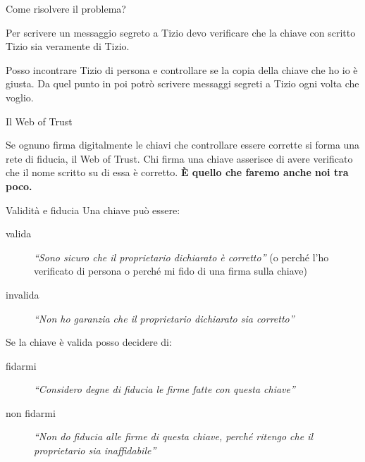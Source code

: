 \documentclass{beamer}
\begin{document}
\begin{frame}{Come risolvere il problema?}

  Per scrivere un messaggio segreto a Tizio devo verificare che la chiave con
  scritto Tizio sia veramente di Tizio.

    Posso incontrare Tizio di persona e controllare se la copia della
    chiave che ho io è giusta. Da quel punto in poi potrò scrivere
    messaggi segreti a Tizio ogni volta che voglio.


  \begin{center}
    
  \end{center}

\end{frame}

\begin{frame}{Il Web of Trust}

  Se ognuno firma digitalmente le chiavi che controllare essere
  corrette si forma una rete di fiducia, il Web of Trust. Chi firma
  una chiave asserisce di avere verificato che il nome scritto su di
  essa è corretto. \textbf{È quello che faremo anche noi tra poco.}

  \pause

  \begin{block}{Validità e fiducia}
    Una chiave può essere:
    \begin{description}
      \item [valida] \emph{``Sono sicuro che il proprietario
        dichiarato è corretto''} (o perché l'ho verificato di persona
        o perché mi fido di una firma sulla chiave)
      \item [invalida] \emph{``Non ho garanzia che il proprietario
        dichiarato sia corretto''}
    \end{description}

    Se la chiave è valida posso decidere di:
    \begin{description}
      \item [fidarmi] \emph{``Considero degne di fiducia le firme
        fatte con questa chiave''}
      \item [non fidarmi] \emph{``Non do fiducia alle firme di questa
        chiave, perché ritengo che il proprietario sia inaffidabile''}
    \end{description}
  \end{block}

\end{frame}
\end{document}
